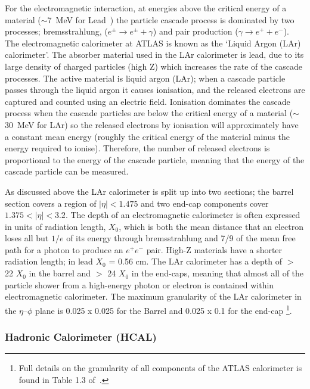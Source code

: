 For the electromagnetic interaction, at energies above the critical energy of a material ($\sim$\SI{7}{\MeV} for Lead~\cite{obj-bjets_PDG})
the particle cascade process is dominated by two processes;
bremsstrahlung, ($e^{\pm} \to e^{\pm} + \gamma$) and pair production ($\gamma \to e^{+} + e^{-}$).
The electromagnetic calorimeter at ATLAS is known as the `Liquid Argon (LAr) calorimeter'.
The absorber material used in the LAr calorimeter is lead, due to its large density of charged particles (high Z)
which increases the rate of the cascade processes.
The active material is liquid argon (LAr);
when a cascade particle passes through the liquid argon it causes ionisation, and the released electrons are captured and counted using an electric field.
Ionisation dominates the cascade process when the cascade particles are below the critical energy of a material ($\sim$\SI{30}{\MeV} for LAr)
so the released electrons by ionisation will approximately have a constant mean energy (roughly the critical energy of the material minus the energy required to ionise).
Therefore, the number of released electrons is proportional to the energy of the cascade particle,
meaning that the energy of the cascade particle can be measured. 

As discussed above the LAr calorimeter is split up into two sections;
the barrel section covers a region of $|\eta| < 1.475$ and two end-cap components cover $1.375 < |\eta| < 3.2$.
The depth of an electromagnetic calorimeter is often expressed in units of radiation length, $X_{0}$,
which is both the mean distance that an electron loses all but  $1/e$ of its energy through bremsstrahlung
and 7/9 of the mean free path for a photon to produce an $e^+e^-$ pair.
High-Z materials have a shorter radiation length; in lead $X_0$ = 0.56 cm.
The LAr calorimeter has a depth of $>$ 22 $X_{0}$ in the barrel and $>$ 24 $X_{0}$ in the end-caps,
meaning that almost all of the particle shower from a high-energy photon
or electron is contained within electromagnetic calorimeter.
The maximum granularity of the LAr calorimeter in the $\eta$--$\phi$ plane
is 0.025 x 0.025 for the Barrel and 0.025 x 0.1 for the end-cap
\footnote{Full details on the granularity of all components of the ATLAS calorimeter is found in Table 1.3 of~\cite{det-ATLAS_Exp}.}. 

\subsubsection{Hadronic Calorimeter (HCAL)}
\label{sec:det-calo_HCAL}

